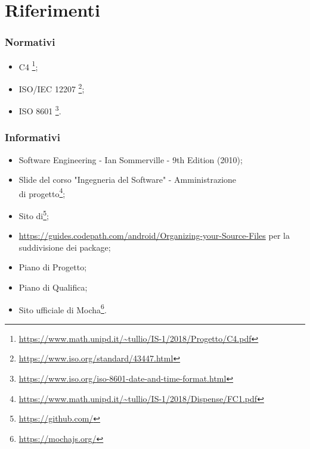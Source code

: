 \section{Riferimenti}
\subsubsection{Normativi}
\begin{itemize}
	\item {} C4
	\footnote{\url{https://www.math.unipd.it/~tullio/IS-1/2018/Progetto/C4.pdf}};
	
	\item ISO/IEC 12207
	\footnote{\url{https://www.iso.org/standard/43447.html}};
	
	\item ISO 8601
	\footnote{\url{https://www.iso.org/iso-8601-date-and-time-format.html}}.
\end{itemize}
\subsubsection{Informativi}
\begin{itemize}
	\item Software Engineering - Ian Sommerville - 9th Edition (2010);
	
	\item Slide del corso "Ingegneria del Software" - Amministrazione\\ di progetto\footnote{\url{https://www.math.unipd.it/~tullio/IS-1/2018/Dispense/FC1.pdf}};
	
	\item Sito di\footnote{\url{https://github.com/}};
	\item \url{https://guides.codepath.com/android/Organizing-your-Source-Files} per la suddivisione dei package; \label{package}
	\item Piano di Progetto;
	\item Piano di Qualifica;
	\item Sito ufficiale di Mocha\footnote{\url{https://mochajs.org/}}.
	
\end{itemize}
\newpage
